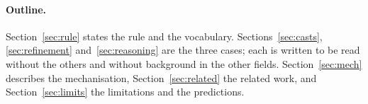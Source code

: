 \paragraph{Outline.} Section~\ref{sec:rule} states the rule and the vocabulary.
Sections~\ref{sec:casts}, \ref{sec:refinement} and~\ref{sec:reasoning} are the three
cases; each is written to be read without the others and without background in the other
fields. Section~\ref{sec:mech} describes the mechanisation, Section~\ref{sec:related} the
related work, and Section~\ref{sec:limits} the limitations and the predictions.
